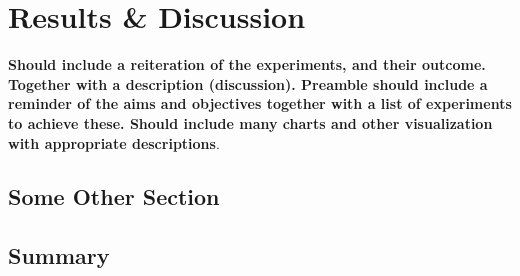 \chapter{Results \& Discussion}
\textbf{Should include a reiteration of the experiments, and their outcome.  Together with a description (discussion).  Preamble should include a reminder of the aims and objectives together with a list of experiments to achieve these.  Should include many charts and other visualization with appropriate descriptions}.  

\Blindtext

\section{Some Other Section}
\Blindtext

\section{Summary}
\blindtext\enlargethispage{\baselineskip} %